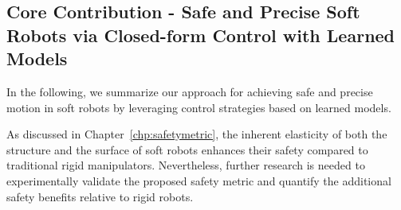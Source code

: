 \subsection{Core Contribution - Safe and Precise Soft Robots via Closed-form Control with Learned Models}\label{sub:conclusion:conclusions:core_contribution}

In the following, we summarize our approach for achieving safe and precise motion in soft robots by leveraging control strategies based on learned models.

As discussed in Chapter~\ref{chp:safetymetric}, the inherent elasticity of both the structure and the surface of soft robots enhances their safety compared to traditional rigid manipulators. Nevertheless, further research is needed to experimentally validate the proposed safety metric and quantify the additional safety benefits relative to rigid robots.

